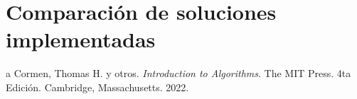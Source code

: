 \documentclass[10pt]{article} %
\begin{document}
	\section{Comparaci\'on de soluciones implementadas}          

%    
%    
%    
%	
	
	\begin{thebibliography}
		a
		 Cormen, Thomas H. y otros. \emph{Introduction to Algorithms}. 
		The MIT Press.
		4ta Edici\'on.		
		Cambridge, Massachusetts.
		2022.
	\end{thebibliography}
\end{document}
